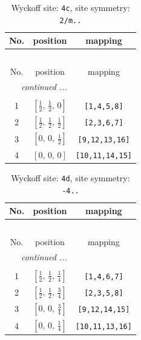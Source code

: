 \documentclass[fleqn,8pt]{jsarticle}
\begin{document}
\renewcommand{\arraystretch}{1.2}
\begin{longtable}{ccc}
\caption{Wyckoff site: {\tt 4c}, site symmetry: {\tt 2/m..}}
 \\
 \hline \hline
No. & position & mapping \\ \hline \endfirsthead

\multicolumn{2}{l}{\tablename\ \thetable{}} \\
 \hline \hline
No. & position & mapping \\ \hline \endhead

 \hline \hline
\multicolumn{2}{r}{\footnotesize\it continued ...} \\ \endfoot

 \hline \hline
\multicolumn{2}{r}{} \\ \endlastfoot

1 & $\left[ \frac{1}{2},\, \frac{1}{2},\, 0 \right]$ & {\tt [1,4,5,8]} \\ \hline
2 & $\left[ \frac{1}{2},\, \frac{1}{2},\, \frac{1}{2} \right]$ & {\tt [2,3,6,7]} \\ \hline
3 & $\left[ 0,\, 0,\, \frac{1}{2} \right]$ & {\tt [9,12,13,16]} \\ \hline
4 & $\left[ 0,\, 0,\, 0 \right]$ & {\tt [10,11,14,15]} \\
\end{longtable}
\renewcommand{\arraystretch}{1.2}
\begin{longtable}{ccc}
\caption{Wyckoff site: {\tt 4d}, site symmetry: {\tt -4..}}
 \\
 \hline \hline
No. & position & mapping \\ \hline \endfirsthead

\multicolumn{2}{l}{\tablename\ \thetable{}} \\
 \hline \hline
No. & position & mapping \\ \hline \endhead

 \hline \hline
\multicolumn{2}{r}{\footnotesize\it continued ...} \\ \endfoot

 \hline \hline
\multicolumn{2}{r}{} \\ \endlastfoot

1 & $\left[ \frac{1}{2},\, \frac{1}{2},\, \frac{1}{4} \right]$ & {\tt [1,4,6,7]} \\ \hline
2 & $\left[ \frac{1}{2},\, \frac{1}{2},\, \frac{3}{4} \right]$ & {\tt [2,3,5,8]} \\ \hline
3 & $\left[ 0,\, 0,\, \frac{3}{4} \right]$ & {\tt [9,12,14,15]} \\ \hline
4 & $\left[ 0,\, 0,\, \frac{1}{4} \right]$ & {\tt [10,11,13,16]} \\
\end{longtable}
\end{document}
